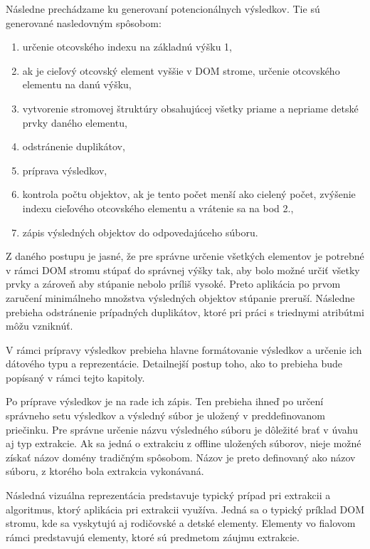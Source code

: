 Následne prechádzame ku generovaní potencionálnych výsledkov. Tie sú generované nasledovným spôsobom:

\bigskip

\begin{enumerate}
    \item určenie otcovského indexu na základnú výšku 1,
    \item ak je cieľový otcovský element vyššie v DOM strome, určenie otcovského elementu na danú výšku,
    \item vytvorenie stromovej štruktúry obsahujúcej všetky priame a nepriame detské prvky daného elementu,
    \item odstránenie duplikátov,
    \item príprava výsledkov,
    \item kontrola počtu objektov, ak je tento počet menší ako cielený počet, zvýšenie indexu cieľového otcovského elementu a vrátenie sa na bod 2.,
    \item zápis výsledných objektov do odpovedajúceho súboru.
\end{enumerate}

\bigskip

Z daného postupu je jasné, že pre správne určenie všetkých elementov je potrebné v rámci DOM stromu stúpať do správnej výšky tak, aby bolo možné určiť všetky prvky a zároveň aby stúpanie nebolo príliš vysoké. Preto aplikácia po prvom zaručení minimálneho množstva výsledných objektov stúpanie preruší. Následne prebieha odstránenie prípadných duplikátov, ktoré pri práci s triednymi atribútmi môžu vzniknúť.

V rámci prípravy výsledkov prebieha hlavne formátovanie výsledkov a určenie ich dátového typu a reprezentácie. Detailnejší postup toho, ako to prebieha bude popísaný v rámci tejto kapitoly. 

Po príprave výsledkov je na rade ich zápis. Ten prebieha ihneď po určení správneho setu výsledkov a výsledný súbor je uložený v preddefinovanom priečinku. Pre správne určenie názvu výsledného súboru je dôležité brať v úvahu aj typ extrakcie. Ak sa jedná o extrakciu z offline uložených súborov, nieje možné získať názov domény tradičným spôsobom. Názov je preto definovaný ako názov súboru, z ktorého bola extrakcia vykonávaná. 

\newpage

Následná vizuálna reprezentácia predstavuje typický prípad pri extrakcii a algoritmus, ktorý aplikácia pri extrakcii využíva. Jedná sa o typický príklad DOM stromu, kde sa vyskytujú aj rodičovské a detské elementy. Elementy vo fialovom rámci predstavujú elementy, ktoré sú predmetom záujmu extrakcie. 

